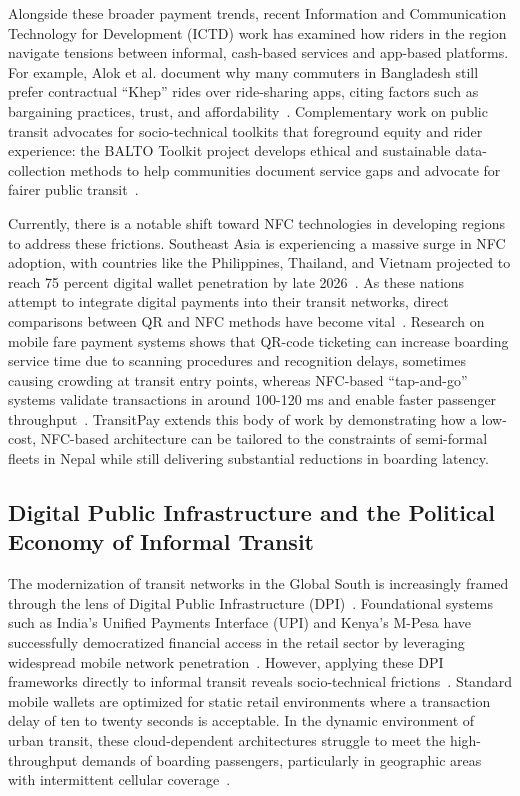 \documentclass[manuscript,review,anonymous]{acmart}
\begin{document}
Alongside these broader payment trends, recent Information and Communication Technology for Development (ICTD) work has examined how riders in the region navigate tensions between informal, cash-based services and app-based platforms. For example, Alok et al. document why many commuters in Bangladesh still prefer contractual ``Khep'' rides over ride-sharing apps, citing factors such as bargaining practices, trust, and affordability~\cite{alok2023khep}. Complementary work on public transit advocates for socio-technical toolkits that foreground equity and rider experience: the BALTO Toolkit project develops ethical and sustainable data-collection methods to help communities document service gaps and advocate for fairer public transit~\cite{frias2023balto}. 

Currently, there is a notable shift toward NFC technologies in developing regions to address these frictions. Southeast Asia is experiencing a massive surge in NFC adoption, with countries like the Philippines, Thailand, and Vietnam projected to reach 75 percent digital wallet penetration by late 2026~\cite{juniper2022digital}. As these nations attempt to integrate digital payments into their transit networks, direct comparisons between QR and NFC methods have become vital~\cite{finvzgar2011use}. Research on mobile fare payment systems shows that QR-code ticketing can increase boarding service time due to scanning procedures and recognition delays, sometimes causing crowding at transit entry points, whereas NFC-based ``tap-and-go'' systems validate transactions in around 100-120 ms and enable faster passenger throughput~\cite{chen2020influence}. TransitPay extends this body of work by demonstrating how a low-cost, NFC-based architecture can be tailored to the constraints of semi-formal fleets in Nepal while still delivering substantial reductions in boarding latency.

\subsection{Digital Public Infrastructure and the Political Economy of Informal Transit}
The modernization of transit networks in the Global South is increasingly framed through the lens of Digital Public Infrastructure (DPI)~\cite{southcentre_dpi_2025}. Foundational systems such as India's Unified Payments Interface (UPI) and Kenya's M-Pesa have successfully democratized financial access in the retail sector by leveraging widespread mobile network penetration~\cite{gowda_upi_2024,suri_jack_2016}. However, applying these DPI frameworks directly to informal transit reveals socio-technical frictions~\cite{southcentre_dpi_2025,worldline_abt_2025}. Standard mobile wallets are optimized for static retail environments where a transaction delay of ten to twenty seconds is acceptable. In the dynamic environment of urban transit, these cloud-dependent architectures struggle to meet the high-throughput demands of boarding passengers, particularly in geographic areas with intermittent cellular coverage~\cite{worldline_abt_2025}.
\end{document}

